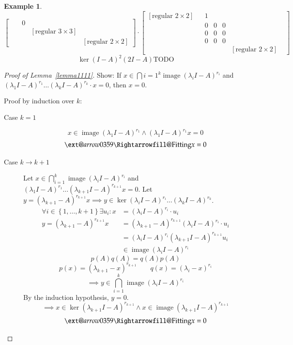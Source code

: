 \documentclass{article}
\makeatletter
\newtheorem{example}{Example}  \numberwithin{example}{section}
\newcommand{\set}[1]{\left\{#1\right\}}
\newcommand{\xRightarrow}[2][]{\ext@arrow 0359\Rightarrowfill@{#1}{#2}}
\DeclareMathOperator{\im}{image}
\makeatother
\begin{document}
\begin{example}
\[\begin{bmatrix}
        &   & 0 & & \\
        &   &   & [\text{regular } 3 \times 3] & \\
        &   &   &       & [\text{regular } 2 \times 2]
    \end{bmatrix} \cdot \begin{bmatrix}
      [\text{regular } 2 \times 2] &
        & 1 &   &   &   & \\
        &   & 0 & 0 & 0 & \\
        &   & 0 & 0 & 0 & \\
        &   & 0 & 0 & 0 & \\
        &   &   &   &   & [\text{regular } 2 \times 2]
    \end{bmatrix}
  \] \[
    \ker(I-A)^2 (2I - A) \text{TODO}
  \]
\end{example}

\begin{proof}[Proof of Lemma~\ref{lemma1111}]
  Show: If $x \in \bigcap{i=1}^k \im(\lambda_i I - A)^{r_i}$ and $(\lambda_1 I - A)^{r_1} \dots (\lambda_k I - A)^{r_k} \cdot x = 0$, then $x = 0$.

  Proof by induction over $k$:
  \begin{description}
    \item[Case $k=1$]
      \[ x \in \im(\lambda_1 I - A)^{r_1} \land (\lambda_1 I - A)^{r_1} x = 0 \]
      \[ \xRightarrow{\text{Fitting}} x = 0 \]
    \item[Case $k \to k+1$]
      Let $x \in \bigcap_{i=1}^k \im(\lambda_i I - A)^{r_i}$ and $(\lambda_1 I - A)^{r_1} \dots (\lambda_{k+1} I - A)^{r_{k+1}} x = 0$.
      Let $y = (\lambda_{k+1} - A)^{r_{k+1}} x \implies y \in \ker(\lambda_i I - A)^{r_i} \dots (\lambda_k I - A)^{r_k}$.
      \begin{align*}
        \forall i \in \set{1, \dots, k+1} \exists u_i: x &= (\lambda_i I - A)^{r_i} \cdot u_i \\
        y = (\lambda_{k+1} - A)^{r_{k+1}} x &= (\lambda_{k+1} - A)^{r_{k+1}} (\lambda_i I - A)^{r_i} \cdot u_i \\
          &= (\lambda_i I - A)^{r_i} (\lambda_{k+1} I - A)^{r_{k+1}} u_i \\
          &\in \im(\lambda_i I - A)^{r_i}
      \end{align*}
      \[ p(A) q(A) = q(A) p(A) \]
      \[ p(x) = (\lambda_{k+1} - x)^{r_{k+1}} \qquad q(x) = (\lambda_i - x)^{r_i} \]
      \[ \implies y \in \bigcap_{i=1}^{k} \im(\lambda_i I - A)^{r_i} \]
      By the induction hypothesis, $y = 0$.
      \[ \implies x \in \ker(\lambda_{k+1} I - A)^{r_{k+1}} \land x \in \im(\lambda_{k+1} I - A)^{r_{k+1}} \]
      \[ \xRightarrow{\text{Fitting}} x = 0 \]
  \end{description}
\end{proof}
\end{document}

